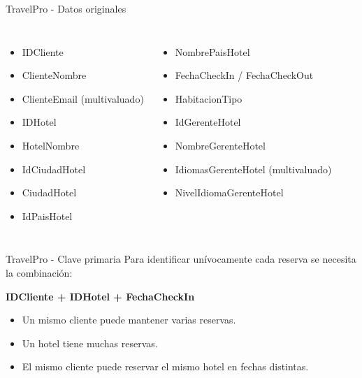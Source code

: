 \documentclass{beamer}
\begin{document}
\begin{frame}{TravelPro - Datos originales}
    \small
    \begin{columns}
            \begin{itemize}
                \item IDCliente
                \item ClienteNombre
                \item ClienteEmail (multivaluado)
                \item IDHotel
                \item HotelNombre
                \item IdCiudadHotel
                \item CiudadHotel
                \item IdPaisHotel
            \end{itemize}
            \begin{itemize}
                \item NombrePaisHotel
                \item FechaCheckIn / FechaCheckOut
                \item HabitacionTipo
                \item IdGerenteHotel
                \item NombreGerenteHotel
                \item IdiomasGerenteHotel (multivaluado)
                \item NivelIdiomaGerenteHotel
            \end{itemize}
    \end{columns}
\end{frame}

\begin{frame}{TravelPro - Clave primaria}
    \small
    Para identificar unívocamente cada reserva se necesita la combinación:
    \begin{center}
        \textbf{IDCliente \quad + \quad IDHotel \quad + \quad FechaCheckIn}
    \end{center}
    \vspace{0.4cm}
    \begin{itemize}
        \item Un mismo cliente puede mantener varias reservas.
        \item Un hotel tiene muchas reservas.
        \item El mismo cliente puede reservar el mismo hotel en fechas distintas.
    \end{itemize}
\end{frame}
\end{document}
